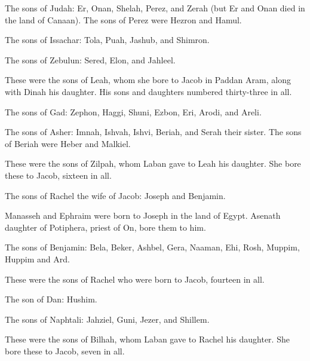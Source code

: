 \begin{scripture}
 The sons of Judah: Er, Onan, Shelah, Perez, and Zerah (but Er and Onan died in the land of Canaan). The sons of Perez were Hezron and Hamul.
\everypar{}

 The sons of Issachar: Tola, Puah, Jashub, and Shimron.
\everypar{}

 The sons of Zebulun: Sered, Elon, and Jahleel.
\everypar{}

 These were the sons of Leah, whom she bore to Jacob in Paddan Aram, along with Dinah his daughter. His sons and daughters numbered thirty-three in all.
\everypar{}

 The sons of Gad: Zephon, Haggi, Shuni, Ezbon, Eri, Arodi, and Areli.
\everypar{}

 The sons of Asher: Imnah, Ishvah, Ishvi, Beriah, and Serah their sister. The sons of Beriah were Heber and Malkiel.
\everypar{}

 These were the sons of Zilpah, whom Laban gave to Leah his daughter. She bore these to Jacob, sixteen in all.
\everypar{}

 The sons of Rachel the wife of Jacob: Joseph and Benjamin.
\everypar{}

 Manasseh and Ephraim were born to Joseph in the land of Egypt. Asenath daughter of Potiphera, priest of On, bore them to him.
\everypar{}

 The sons of Benjamin: Bela, Beker, Ashbel, Gera, Naaman, Ehi, Rosh, Muppim, Huppim and Ard.
\everypar{}

 These were the sons of Rachel who were born to Jacob, fourteen in all.
\everypar{}

 The son of Dan: Hushim.
\everypar{}

 The sons of Naphtali: Jahziel, Guni, Jezer, and Shillem.
\everypar{}

 These were the sons of Bilhah, whom Laban gave to Rachel his daughter. She bore these to Jacob, seven in all.
\everypar{}


\end{scripture}
